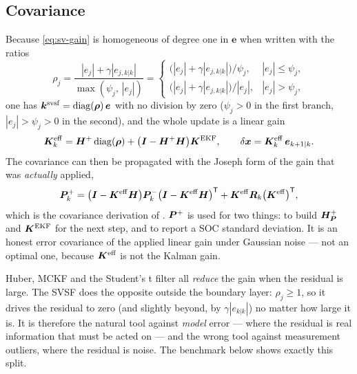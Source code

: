 \subsection{Covariance}
Because \eqref{eq:sv-gain} is homogeneous of degree one in $\bm{e}$ when written with the ratios
\begin{equation}
\rho_j = \frac{|e_j|+\gamma|e_{j,k|k}|}{\max(\psi_j,\,|e_j|)}
       = \begin{cases}
         \big(|e_j|+\gamma|e_{j,k|k}|\big)/\psi_j, & |e_j|\le\psi_j,\\[2pt]
         \big(|e_j|+\gamma|e_{j,k|k}|\big)/|e_j|, & |e_j|>\psi_j,
         \end{cases}
\label{eq:sv-ratio}
\end{equation}
one has $\bm{k}^{\mathrm{svsf}}=\operatorname{diag}(\bm\rho)\,\bm{e}$ with no division by zero ($\psi_j>0$ in the
first branch, $|e_j|>\psi_j>0$ in the second), and the whole update is a linear gain
\begin{equation}
\bm{K}^{\mathrm{eff}}_{k}=\bm{H}^{+}\operatorname{diag}(\bm\rho)+\big(\bm{I}-\bm{H}^{+}\bm{H}\big)\bm{K}^{\mathrm{EKF}},
\qquad \delta\bm{x}=\bm{K}^{\mathrm{eff}}_k\,\bm{e}_{k+1|k}.
\label{eq:sv-Keff}
\end{equation}
The covariance can then be propagated with the Joseph form of the gain that was \emph{actually}
applied,
\begin{equation}
\bm{P}^{+}_k=\big(\bm{I}-\bm{K}^{\mathrm{eff}}\bm{H}\big)\bm{P}^{-}_k\big(\bm{I}-\bm{K}^{\mathrm{eff}}\bm{H}\big)^{\mathsf{T}}
        +\bm{K}^{\mathrm{eff}}\bm{R}_k\big(\bm{K}^{\mathrm{eff}}\big)^{\mathsf{T}},
\label{eq:sv-P}
\end{equation}
which is the covariance derivation of \cite{gadsden2010svsfcov}.  $\bm{P}^{+}$ is used for two things:
to build $\bm{H}^{+}_{\bm{P}}$ and $\bm{K}^{\mathrm{EKF}}$ for the next step, and to report a SOC standard
deviation.  It is an honest error covariance of the applied linear gain under Gaussian noise ---
not an optimal one, because $\bm{K}^{\mathrm{eff}}$ is not the Kalman gain.

\begin{remark}\label{rem:sv-rel}
Huber, MCKF and the Student's t filter all \emph{reduce} the gain when the residual is large.  The
SVSF does the opposite outside the boundary layer: $\rho_j\ge1$, so it drives the residual to zero
(and slightly beyond, by $\gamma|e_{k|k}|$) no matter how large it is.  It is therefore the natural
tool against \emph{model} error --- where the residual is real information that must be acted on
--- and the wrong tool against measurement outliers, where the residual is noise.  The benchmark
below shows exactly this split.
\end{remark}

